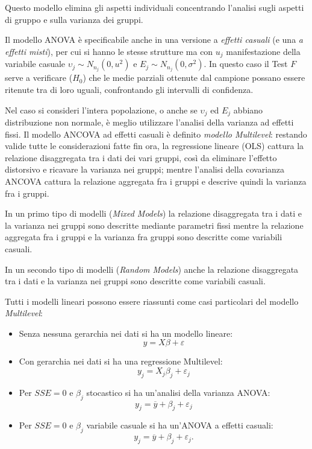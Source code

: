 \documentclass[a4page, 11pt]{article} %
\begin{document}
Questo modello elimina gli aspetti individuali concentrando l'analisi sugli aspetti di gruppo e sulla varianza dei gruppi.

Il modello ANOVA è specificabile anche in una versione a \textit{effetti casuali} (e una \textit{a effetti misti}), per cui si hanno le stesse strutture ma con $u_j$ manifestazione della variabile casuale $\upsilon_j \sim N_{n_j}(0, u^2)$ e $E_j \sim N_{n_j}(0, \sigma^2)$.
In questo caso il Test $F$ serve a verificare ($H_0$) che le medie parziali ottenute dal campione possano essere ritenute tra di loro uguali, confrontando gli intervalli di confidenza.

Nel caso si consideri l'intera popolazione, o anche se $\upsilon_j$ ed $E_j$ abbiano distribuzione non normale, è meglio utilizzare l'analisi della varianza ad effetti fissi.
Il modello ANCOVA ad effetti casuali è definito \textit{modello Multilevel}: restando valide tutte le considerazioni fatte fin ora, la regressione lineare (OLS) cattura la relazione disaggregata tra i dati dei vari gruppi, così da eliminare l'effetto distorsivo e ricavare la varianza nei gruppi; mentre l'analisi della covarianza ANCOVA cattura la relazione aggregata fra i gruppi e descrive quindi la varianza fra i gruppi.

In un primo tipo di modelli (\textit{Mixed Models}) la relazione disaggregata tra i dati e la varianza nei gruppi sono descritte mediante parametri fissi mentre la relazione aggregata fra i gruppi e la varianza fra gruppi sono descritte come variabili casuali.

In un secondo tipo di modelli (\textit{Random Models}) anche la relazione disaggregata tra i dati e la varianza nei gruppi sono descritte come variabili casuali.

Tutti i modelli lineari possono essere riassunti come casi particolari del modello \textit{Multilevel}:
\begin{itemize}
\item Senza nessuna gerarchia nei dati si ha un modello lineare: 
\begin{equation*}
y = X \beta + \varepsilon
\end{equation*}
\item Con gerarchia nei dati si ha una regressione Multilevel: 
\begin{equation*}
y_j = X_j \beta_j + \varepsilon_j
\end{equation*}
\item Per $SSE = 0$ e $\beta_j$ stocastico si ha un'analisi della varianza ANOVA: 
\begin{equation*}
y_j = \overline{y} + \beta_j + \varepsilon_j
\end{equation*}
\item Per $SSE = 0$ e $\beta_j$ variabile casuale si ha un'ANOVA a effetti casuali: 
\begin{equation*}
y_j = \overline{y} + \beta_j + \varepsilon_j.
\end{equation*}
\end{itemize}
\end{document}
